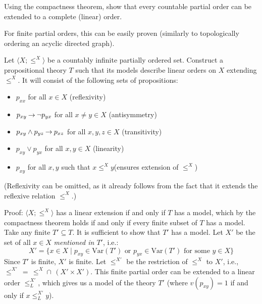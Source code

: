 \begin{problem}
    Using the compactness theorem, show that every countable partial order can be extended to a complete (linear) order.

    \begin{solution}

        For finite partial orders, this can be easily proven (similarly to topologically ordering an acyclic directed graph). 
        
        Let $\langle X;\leq^X\rangle$ be a countably infinite partially ordered set. Construct a propositional theory $T$ such that its models describe linear orders on $X$ extending $\leq^X$. It will consist of the following sets of propositions:
        \begin{itemize}
            \item $p_{xx}$ for all $x\in X$ \hfill (reflexivity)
            \item $p_{xy}\mathbin{\rightarrow}\neg p_{yx}$ for all $x\neq y\in X$ \hfill (antisymmetry)
            \item $p_{xy}\land p_{yz}\mathbin{\rightarrow} p_{xz}$ for all $x,y,z\in X$ \hfill (transitivity)
            \item $p_{xy}\lor p_{yx}$ for all $x,y\in X$ \hfill (linearity)
            \item $p_{xy}$ for all $x,y$ such that $x\leq^X y$\hfill (ensures extension of $\leq^X$)
        \end{itemize}
        (Reflexivity can be omitted, as it already follows from the fact that it extends the reflexive relation $\leq^X$.)

        Proof: $\langle X;\leq^X\rangle$ has a linear extension if and only if $T$ has a model, which by the compactness theorem holds if and only if every finite subset of $T$ has a model. Take any finite $T'\subseteq T$. It is sufficient to show that $T'$ has a model. Let $X'$ be the set of all $x\in X$ \emph{mentioned in $T'$}, i.e.:
        $$
        X'=\{x\in X\mid p_{xy}\in\mathrm{Var}(T')\text{ or }p_{yx}\in\mathrm{Var}(T')\text{ for some }y\in X\}
        $$
        Since $T'$ is finite, $X'$ is finite. Let $\leq^{X'}$ be the restriction of $\leq^X$ to $X'$, i.e., $\leq^{X'}\,=\,\leq^X \mathbin{\cap}\, (X'\times X')$. This finite partial order can be extended to a linear order $\leq^{X'}_L$, which gives us a model of the theory $T'$ (where $v(p_{xy})=1$ if and only if $x\leq^{X'}_L y$).
        
    \end{solution}
    
\end{problem}
        
